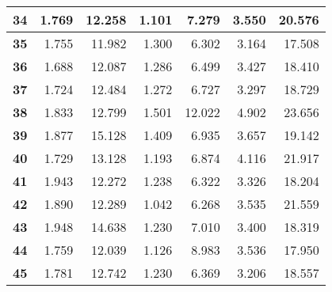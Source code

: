 \documentclass[12pt]{article}
\begin{document}
\begin{table}[!htbp]
{\begin{tabular}{crrrrr|r|}
\multicolumn{1}{|c|}{\textbf{34}} & \multicolumn{1}{r|}{1.769} & \multicolumn{1}{r|}{12.258} & \multicolumn{1}{r|}{1.101} & \multicolumn{1}{r|}{7.279} & 3.550 & 20.576 \\ \hline
\multicolumn{1}{|c|}{\textbf{35}} & \multicolumn{1}{r|}{1.755} & \multicolumn{1}{r|}{11.982} & \multicolumn{1}{r|}{1.300} & \multicolumn{1}{r|}{6.302} & 3.164 & 17.508 \\ \hline
\multicolumn{1}{|c|}{\textbf{36}} & \multicolumn{1}{r|}{1.688} & \multicolumn{1}{r|}{12.087} & \multicolumn{1}{r|}{1.286} & \multicolumn{1}{r|}{6.499} & 3.427 & 18.410 \\ \hline
\multicolumn{1}{|c|}{\textbf{37}} & \multicolumn{1}{r|}{1.724} & \multicolumn{1}{r|}{12.484} & \multicolumn{1}{r|}{1.272} & \multicolumn{1}{r|}{6.727} & 3.297 & 18.729 \\ \hline
\multicolumn{1}{|c|}{\textbf{38}} & \multicolumn{1}{r|}{1.833} & \multicolumn{1}{r|}{12.799} & \multicolumn{1}{r|}{1.501} & \multicolumn{1}{r|}{12.022} & 4.902 & 23.656 \\ \hline
\multicolumn{1}{|c|}{\textbf{39}} & \multicolumn{1}{r|}{1.877} & \multicolumn{1}{r|}{15.128} & \multicolumn{1}{r|}{1.409} & \multicolumn{1}{r|}{6.935} & 3.657 & 19.142 \\ \hline
\multicolumn{1}{|c|}{\textbf{40}} & \multicolumn{1}{r|}{1.729} & \multicolumn{1}{r|}{13.128} & \multicolumn{1}{r|}{1.193} & \multicolumn{1}{r|}{6.874} & 4.116 & 21.917 \\ \hline
\multicolumn{1}{|c|}{\textbf{41}} & \multicolumn{1}{r|}{1.943} & \multicolumn{1}{r|}{12.272} & \multicolumn{1}{r|}{1.238} & \multicolumn{1}{r|}{6.322} & 3.326 & 18.204 \\ \hline
\multicolumn{1}{|c|}{\textbf{42}} & \multicolumn{1}{r|}{1.890} & \multicolumn{1}{r|}{12.289} & \multicolumn{1}{r|}{1.042} & \multicolumn{1}{r|}{6.268} & 3.535 & 21.559 \\ \hline
\multicolumn{1}{|c|}{\textbf{43}} & \multicolumn{1}{r|}{1.948} & \multicolumn{1}{r|}{14.638} & \multicolumn{1}{r|}{1.230} & \multicolumn{1}{r|}{7.010} & 3.400 & 18.319 \\ \hline
\multicolumn{1}{|c|}{\textbf{44}} & \multicolumn{1}{r|}{1.759} & \multicolumn{1}{r|}{12.039} & \multicolumn{1}{r|}{1.126} & \multicolumn{1}{r|}{8.983} & 3.536 & 17.950 \\ \hline
\multicolumn{1}{|c|}{\textbf{45}} & \multicolumn{1}{r|}{1.781} & \multicolumn{1}{r|}{12.742} & \multicolumn{1}{r|}{1.230} & \multicolumn{1}{r|}{6.369} & 3.206 & 18.557 \\ \hline

\end{tabular}}
\end{table}
\end{document}
